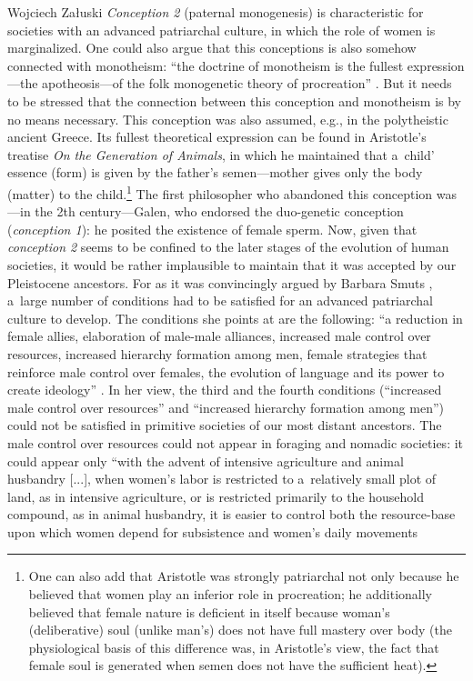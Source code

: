 \begin{artengenv}{Wojciech Załuski}
\textit{Conception 2} (paternal monogenesis) is characteristic for societies with an advanced patriarchal culture, in which the role of women is marginalized. One could also argue that this conceptions is also somehow connected with monotheism: ``the doctrine of monotheism is the fullest expression---the apotheosis---of the folk monogenetic theory of procreation''
\parencite[][p.502]{delaney_meaning_1986}. %
 But it needs to be stressed that the connection between this conception and monotheism is by no means necessary. This conception was also assumed, e.g., in the polytheistic ancient Greece. Its fullest theoretical expression can be found in Aristotle's treatise \textit{On the Generation of Animals}, in which he maintained that a~child' essence (form) is given by the father's semen---mother gives only the body (matter) to the child.\footnote{One can also add that Aristotle was strongly patriarchal not only because he believed that women play an inferior role in procreation; he additionally believed that female nature is deficient in itself because woman's (deliberative) soul (unlike man's) does not have full mastery over body (the physiological basis of this difference was, in Aristotle's view, the fact that female soul is generated when semen does not have the sufficient heat).} The first philosopher who abandoned this conception was---in the 2th century---Galen, who endorsed the duo-genetic conception (\textit{conception 1}): he posited the existence of female sperm. Now, given that \textit{conception 2} seems to be confined to the later stages of the evolution of human societies, it would be rather implausible to maintain that it was accepted by our Pleistocene ancestors. For as it was convincingly argued by Barbara Smuts 
\parencite*[][]{smuts_evolutionary_1995}, %
 a~large number of conditions had to be satisfied for an advanced patriarchal culture to develop. The conditions she points at are the following: ``a reduction in female allies, elaboration of male-male alliances, increased male control over resources, increased hierarchy formation among men, female strategies that reinforce male control over females, the evolution of language and its power to create ideology'' 
\parencite[][p.20]{smuts_evolutionary_1995}. %
 In her view, the third and the fourth conditions (``increased male control over resources'' and ``increased hierarchy formation among men'') could not be satisfied in primitive societies of our most distant ancestors. The male control over resources could not appear in foraging and nomadic societies: it could appear only ``with the advent of intensive agriculture and animal husbandry [...], when women's labor is restricted to a~relatively small plot of land, as in intensive agriculture, or is restricted primarily to the household compound, as in animal husbandry, it is easier to control both the resource-base upon which women depend for subsistence and women's daily movements 

\end{artengenv}
